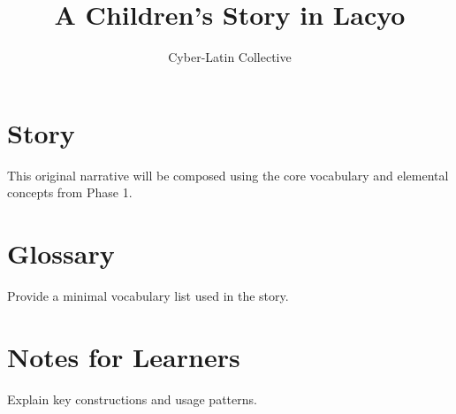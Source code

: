 \documentclass[12pt]{book}
\title{A Children's Story in Lacyo}
\author{Cyber-Latin Collective}
\date{}
\begin{document}
\maketitle
\tableofcontents

\chapter{Story}
This original narrative will be composed using the core vocabulary and
elemental concepts from Phase 1.

\chapter{Glossary}
Provide a minimal vocabulary list used in the story.

\chapter{Notes for Learners}
Explain key constructions and usage patterns.
\end{document}
